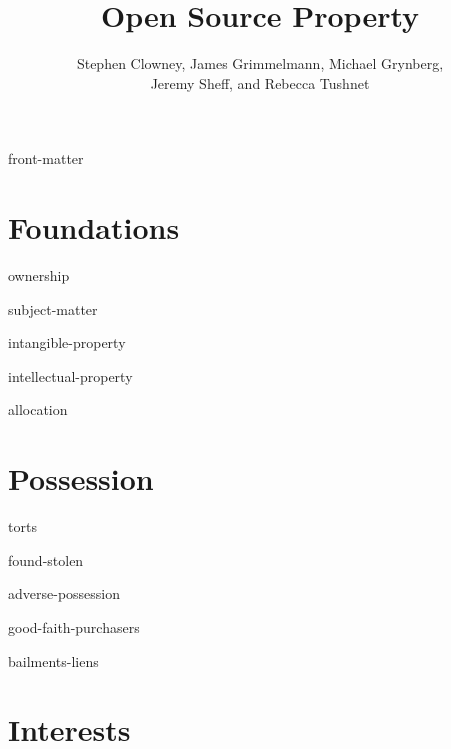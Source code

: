\documentclass[12pt]{book}
\title{Open Source Property}
\author{Stephen Clowney, James Grimmelmann, Michael Grynberg,\\
Jeremy Sheff, and Rebecca Tushnet}
\begin{document}
%
%
\sloppy
\frenchspacing
\raggedbottom
{}

%
%

\frontmatter

\maketitle

\tableofcontents

\module front-matter



%
%

\mainmatter


%
%

\part{Foundations}

\module ownership

\module subject-matter

\module intangible-property

\module intellectual-property

\module allocation



\part{Possession}

\module torts

\module found-stolen

\module adverse-possession

\module good-faith-purchasers

\module bailments-liens


\part{Interests}
\end{document}

